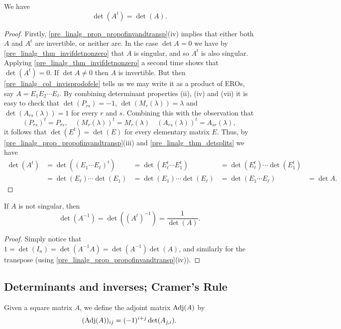 \documentclass[10pt, a4paper]{article}
\begin{document}
\begin{theorem}
    We have
    \[
    \det(A ^ t) = \det(A).
    \]
    \begin{proof}
        Firstly,
        \autoref{pre_linalg_prop_propofinvandtransp}(iv) implies that either both $A$ and $A ^ t$ are invertible,
        or neither are.
        In the case $\det A = 0$ we have by \autoref{pre_linalg_thm_invifdetnonzero} that $A$ is singular,
        and so $A ^ t$ is also singular.
        Applying \autoref{pre_linalg_thm_invifdetnonzero} a second time shows that $\det(A ^ t) = 0$.
        If $\det A \neq 0$ then $A$ is invertible.
        But then \autoref{pre_linalg_col_invisprodofele} tells us we may write it as a product of EROs,
        say $A = E_1E_2\dotsi E_\ell$.
        By combining determinant properties (ii),
        (iv) and (vii) it is easy to check that $\det(P_{rs}) = -1$,
        $\det(M_r(\lambda)) = \lambda$ and $\det(A_{rs}(\lambda)) = 1$ for every $r$ and $s$.
        Combining this with the observation that
        \[
        (P_{rs}) ^ t = P_{rs},\quad(M_{r}(\lambda)) ^ t = M_r(\lambda)\quad(A_{rs}(\lambda)) ^ t = A_{sr}(\lambda),
        \]
        it follows that $\det(E ^ t) = \det(E)$ for every elementary matrix $E$.
        Thus,
        by \autoref{pre_linalg_prop_propofinvandtransp}(iii) and \autoref{pre_linalg_thm_detsplits} we have
        \begin{align*}
            \det(A ^ t) &= \det((E_1\dotsi E_\ell) ^ t) &= \det(E_\ell ^ t \dotsi E_1 ^ t) &= \det(E_\ell ^ t)\dotsi\det(E_1 ^ t) \\
            &= \det(E_\ell)\dotsi\det(E_1) &= \det(E_1)\dotsi\det(E_\ell) &= \det(E_1 \dotsi E_\ell) &= \det A.
        \end{align*}
    \end{proof}
\end{theorem}

\begin{corollary}
    If $A$ is not singular,
    then
    \[
    \det(A ^ {-1}) = \det((A ^ t) ^ {-1}) = \frac{1}{\det(A)}.
    \]
    \begin{proof}
        Simply notice that $1 = \det(I_n) = \det(A ^ {-1}A) = \det(A ^ {-1})\det(A)$,
        and similarly for the transpose (using \autoref{pre_linalg_prop_propofinvandtransp}(iv)).
    \end{proof}
\end{corollary}

\subsection{Determinants and inverses; Cramer's Rule}
\begin{definition}
    Given a square matrix $A$,
    we define the adjoint matrix $\operatorname{Adj}(A)$ by
    \[
    (\operatorname{Adj}(A))_{ij} = (-1) ^ {i + j}\det(A_{j, i}).
    \]
\end{definition}
\end{document}
